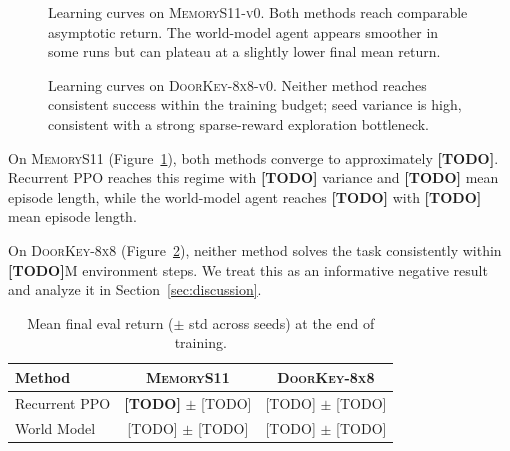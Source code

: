 \begin{figure}[t]
\centering
\caption{Learning curves on \textsc{MemoryS11-v0}. Both methods reach comparable asymptotic return. The world-model agent appears smoother in some runs but can plateau at a slightly lower final mean return.}
\label{fig:memory}
\end{figure}

\begin{figure}[t]
\centering
\caption{Learning curves on \textsc{DoorKey-8x8-v0}. Neither method reaches consistent success within the training budget; seed variance is high, consistent with a strong sparse-reward exploration bottleneck.}
\label{fig:doorkey}
\end{figure}

On \textsc{MemoryS11} (Figure~\ref{fig:memory}), both methods converge to approximately \textbf{[TODO]}. Recurrent PPO reaches this regime with \textbf{[TODO]} variance and \textbf{[TODO]} mean episode length, while the world-model agent reaches \textbf{[TODO]} with \textbf{[TODO]} mean episode length.

On \textsc{DoorKey-8x8} (Figure~\ref{fig:doorkey}), neither method solves the task consistently within \textbf{[TODO]}M environment steps. We treat this as an informative negative result and analyze it in Section~\ref{sec:discussion}.

\begin{table}[t]
\centering
\small
\begin{tabular}{lcc}
\toprule
Method & \textsc{MemoryS11} & \textsc{DoorKey-8x8} \\
\midrule
Recurrent PPO  & \textbf{[TODO]} $\pm$ [TODO] & [TODO] $\pm$ [TODO] \\
World Model    & [TODO] $\pm$ [TODO] & [TODO] $\pm$ [TODO] \\
\bottomrule
\end{tabular}
\caption{Mean final eval return ($\pm$ std across seeds) at the end of training.}
\label{tab:final}
\end{table}

